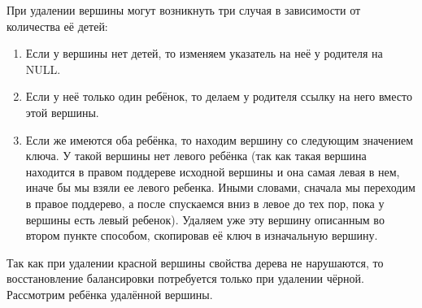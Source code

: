 При удалении вершины могут возникнуть три случая в зависимости от количества её детей:
\begin{enumerate}
    \item Если у вершины нет детей, то изменяем указатель на неё у родителя на NULL.
    \item Если у неё только один ребёнок, то делаем у родителя ссылку на него вместо этой вершины.
    \item Если же имеются оба ребёнка, то находим вершину со следующим значением ключа.
    У такой вершины нет левого ребёнка (так как такая вершина находится в правом поддереве исходной вершины и она самая левая в нем, иначе бы мы взяли ее левого ребенка.
    Иными словами, сначала мы переходим в правое поддерево, а после спускаемся вниз в левое до тех пор, пока у вершины есть левый ребенок).
    Удаляем уже эту вершину описанным во втором пункте способом, скопировав её ключ в изначальную вершину.
\end{enumerate}

Так как при удалении красной вершины свойства дерева не нарушаются, то восстановление балансировки потребуется только при удалении чёрной.
Рассмотрим ребёнка удалённой вершины.

